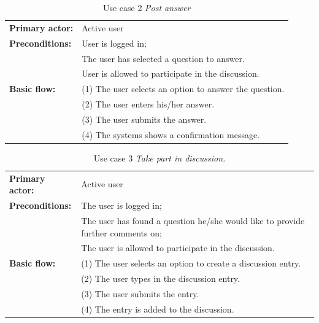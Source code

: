 \begin{table}[h]
\caption{Use case 2 \textit{Post answer}}
\begin{center}
	\begin{tabular}{ l p{300px} }
		\hline
		\textbf{Primary actor:}	& Active user \\

		\textbf{Preconditions:}	& User is logged in; \\
														& The user has selected a question to answer. \\
														& User is allowed to participate in the discussion. \\

		\textbf{Basic flow:}	& (1) The user selects an option to answer the question. \\
													& (2) The user enters his/her answer. \\
													& (3) The user submits the answer. \\
													& (4) The systems shows a confirmation message. \\

		\hline
	\end{tabular}
\end{center}
\label{table:use_case2}
\end{table}



\begin{table}[h]
\caption{Use case 3 \textit{Take part in discussion.}}
\begin{center}
	\begin{tabular}{ l p{300px} }
		\hline
		\textbf{Primary actor:}	& Active user \\

		\textbf{Preconditions:}	& The user is logged in; \\
														& The user has found a question he/she would like to provide further comments on; \\
														& The user is allowed to participate in the discussion.\\

		\textbf{Basic flow:}	& (1) The user selects an option to create a discussion entry. \\
													&	(2) The user types in the discussion entry.	\\
													& (3) The user submits the entry. \\
													& (4) The entry is added to the discussion. \\

		\hline
	\end{tabular}
\end{center}
\label{table:use_case3}
\end{table}



